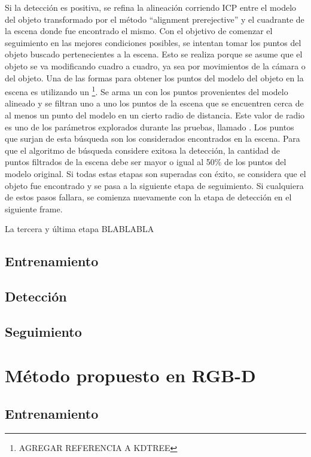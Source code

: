 Si la detección es positiva, se refina la alineación corriendo ICP entre el modelo del objeto transformado por el método ``alignment prerejective'' y el cuadrante de la escena donde fue encontrado el mismo. Con el objetivo de comenzar el seguimiento en las mejores condiciones posibles, se intentan tomar los puntos del objeto buscado pertenecientes a la escena. Esto se realiza porque se asume que el objeto se va modificando cuadro a cuadro, ya sea por movimientos de la cámara o del objeto. Una de las formas para obtener los puntos del modelo del objeto en la escena es utilizando un \kdt\footnote{AGREGAR REFERENCIA A KDTREE}.  Se arma un \kdt con los puntos provenientes del modelo alineado y se filtran uno a uno los puntos de la escena que se encuentren cerca de al menos un punto del modelo en un cierto radio de distancia. Este valor de radio es uno de los parámetros explorados durante las pruebas, llamado . Los puntos que surjan de esta búsqueda son los considerados encontrados en la escena. Para que el algoritmo de búsqueda considere exitosa la detección, la cantidad de puntos filtrados de la escena debe ser mayor o igual al 50\% de los puntos del modelo original. Si todas estas etapas son superadas con éxito, se considera que el objeto fue encontrado y se pasa a la siguiente etapa de seguimiento. Si cualquiera de estos pasos fallara, se comienza nuevamente con la etapa de detección en el siguiente frame.

La tercera y última etapa BLABLABLA

\subsection{Entrenamiento}

\subsection{Detección}


\subsection{Seguimiento}

\section{Método propuesto en RGB-D}

\subsection{Entrenamiento}

